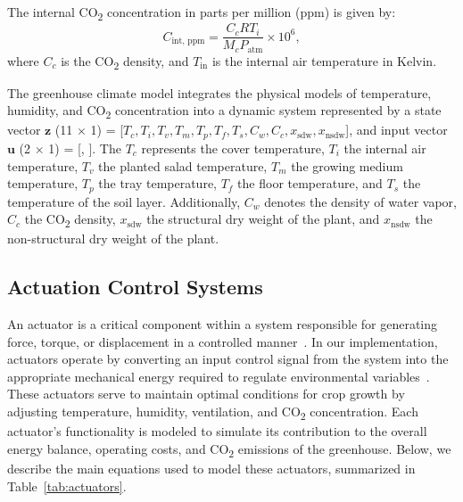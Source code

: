 \documentclass[conference]{IEEEtran}
\begin{document}
The internal CO\textsubscript{2} concentration in parts per million (ppm) is given by:
\begin{equation}
    C_{\text{int, ppm}} = \frac{C_c  R  T_i}{M_c  P_{\text{atm}}} \times 10^6,
\end{equation}
where \(C_c\) is the CO\textsubscript{2} density, and \(T_{\text{in}}\) is the internal air temperature in Kelvin.

The greenhouse climate model integrates the physical models of temperature, humidity, and CO\textsubscript{2} concentration into a dynamic system represented by a state vector \(\mathbf{z}\)
(11 \(\times \) 1) = [\(T_c, T_i, T_v, T_m, T_p, T_f, T_s, C_w, C_c, x_{\text{sdw}}, x_{\text{nsdw}}\)], and input vector \(\mathbf{u}\) (2 \(\times \) 1) = 
[, ]. The \(T_c\) represents the cover temperature, \(T_i\) the internal air temperature, \(T_v\) the planted salad temperature, \(T_m\) the growing medium temperature, \(T_p\) the tray temperature, \(T_f\) the floor temperature, and \(T_s\) the temperature of the soil layer. Additionally, \(C_w\) denotes the density of water vapor, \(C_c\) the CO\textsubscript{2} density, \(x_{\text{sdw}}\) the structural dry weight of the plant, and \(x_{\text{nsdw}}\) the non-structural dry weight of the plant.

\subsection{Actuation Control Systems}
An actuator is a critical component within a system responsible for generating force, torque, or displacement in a controlled manner~\cite{Escudier2019}. In our implementation, actuators operate by converting an input control signal from the system into the appropriate mechanical energy required to regulate environmental variables~\cite{Butterfield2018}. These actuators serve to maintain optimal conditions for crop growth by
adjusting temperature, humidity, ventilation, and CO\textsubscript{2} concentration. Each actuator's functionality is modeled to simulate its contribution to the overall energy balance, operating costs, and CO\textsubscript{2} emissions of the greenhouse. Below, we describe the main equations used to model these actuators, summarized in Table~\ref{tab:actuators}.
\end{document}
